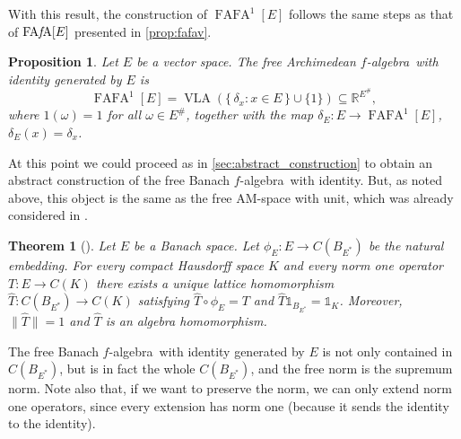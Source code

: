 \documentclass{memo-l}
\newtheorem{thm}[theorem]{Theorem}
\newtheorem{prop}[theorem]{Proposition}
\theoremstyle{definition}
\theoremstyle{remark}
\numberwithin{section}{chapter}
\numberwithin{equation}{chapter}
\newcommand\R{\ensuremath{\mathbb{R}}}
\newcommand{\one}{\ensuremath{\mathbb{1}}}
\newcommand{\falg}{$f\!$-algebra}
\newcommand{\VLA}{\operatorname{VLA}}
\newcommand{\FAFAv}[1]{\operatorname{FA{\it f}\!A}[#1]}
\newcommand{\FAFAov}[1]{\operatorname{FAFA}^1[#1]}
\begin{document}
With this result, the construction of $\FAFAov E$ follows the same
steps as that of $\FAFAv E$ presented in \cref{prop:fafav}.

\begin{prop}
    Let $E$ be a vector space. The free Archimedean \falg\ with
    identity generated by $E$ is
    \[
        \FAFAov E=\VLA(\{\, \delta _x : x \in E \, \} \cup
        \{1\})\subseteq \R^{E^{\#}},
    \]
    where $1(\omega )=1$ for all $\omega \in E^{\#}$, together with
    the map $\delta_E \colon E\to \FAFAov E$, $\delta_E(x)=\delta _x$.
\end{prop}

At this point we could proceed as in \cref{sec:abstract_construction} to obtain an abstract
construction of the free Banach \falg\ with identity. But, as noted above,
this object is the same as the free AM-space with unit, which was
already considered in \cite[Theorem 5.4]{jardon-sanchez_etal2022}.

\begin{thm}[{\cite[Theorem 5.4]{jardon-sanchez_etal2022}}]
    Let $E$ be a Banach space. Let $\phi _E\colon E\to C(B_{E^{*}})$
    be the natural embedding. For every compact Hausdorff space $K$
    and every norm one operator $T\colon E\to C(K)$ there exists a
    unique lattice homomorphism $\hat{T}\colon C(B_{E^{*}})\to C(K)$
    satisfying $\hat{T}\circ \phi _E=T$ and
    $\hat{T}\one_{B_{E^{*}}}=\one_K$. Moreover, $\|\hat{T}\|=1$
    and $\hat{T}$ is an algebra homomorphism.
\end{thm}

The free Banach \falg\ with identity generated by $E$ is not only
contained in $C(B_{E^{*}})$, but is in fact the whole $C(B_{E^{*}})$,
and the free norm is the supremum norm. Note also that, if we want to
preserve the norm, we can only extend norm one operators, since every
extension has norm one (because it sends the identity to the
identity).


% 

\backmatter



\end{document}
